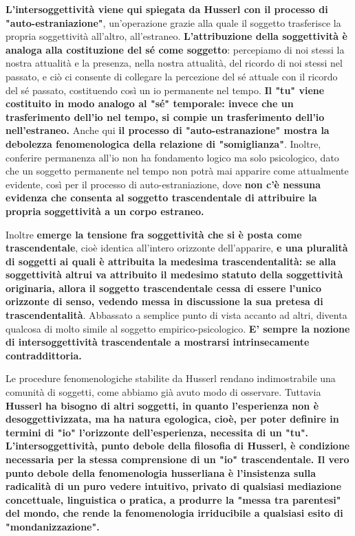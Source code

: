 \textbf{L'intersoggettività viene qui spiegata da Husserl con il
processo di "auto-estraniazione"}, un'operazione grazie
alla quale il soggetto trasferisce la propria soggettività
all'altro, all'estraneo. \textbf{L'attribuzione della
soggettività è analoga alla costituzione del sé
come soggetto}: percepiamo di noi stessi la nostra
attualità e la presenza, nella nostra attualità, del
ricordo di noi stessi nel passato, e ciò ci consente di collegare
la percezione del sé attuale con il ricordo del sé
passato, costituendo così un io permanente nel
tempo. \textbf{Il "tu" viene costituito in modo analogo
al "sé" temporale: invece che un trasferimento
dell'io nel tempo, si compie un trasferimento
dell'io nell'estraneo.}
Anche qui \textbf{il processo di "auto-estranazione" mostra
la debolezza fenomenologica della relazione di
"somiglianza"}. Inoltre, conferire permanenza all'io
non ha fondamento logico ma solo psicologico, dato che
un soggetto permanente nel tempo non potrà mai
apparire come attualmente evidente, così per il
processo di auto-estraniazione, dove \textbf{non c'è nessuna
evidenza che consenta al soggetto trascendentale
di attribuire la propria soggettività a un corpo
estraneo.}

Inoltre \textbf{emerge la tensione fra soggettività  che si è posta come trascendentale}, cioè identica all'intero orizzonte dell'apparire, \textbf{e una pluralità di soggetti ai quali è attribuita la medesima trascendentalità: se alla soggettività altrui va attribuito il medesimo statuto della soggettività originaria, allora il soggetto trascendentale cessa di essere l'unico orizzonte di senso, vedendo messa in discussione la sua pretesa di trascendentalità}. Abbassato a semplice punto di vista accanto ad altri, diventa qualcosa di molto simile al soggetto empirico-psicologico. \textbf{E' sempre la nozione di intersoggettività trascendentale a mostrarsi intrinsecamente contraddittoria.}

Le procedure fenomenologiche stabilite da Husserl rendano indimostrabile una comunità di soggetti, come abbiamo già avuto modo di osservare. Tuttavia \textbf{Husserl ha bisogno di altri soggetti, in quanto l'esperienza non è desoggettivizzata, ma ha natura egologica, cioè, per poter definire in termini di "io" l'orizzonte dell'esperienza, necessita di un "tu". L'intersoggettività, punto debole della filosofia di Husserl, è condizione necessaria per la stessa comprensione di un "io" trascendentale. Il vero punto debole della fenomenologia husserliana è l'insistenza sulla radicalità di un puro vedere intuitivo, privato di qualsiasi mediazione concettuale, linguistica o pratica, a produrre la "messa tra parentesi" del mondo, che rende la fenomenologia irriducibile a qualsiasi esito di "mondanizzazione".}

